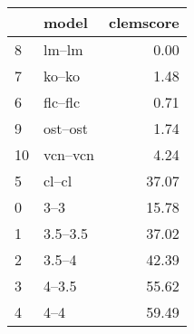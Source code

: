 \begin{tabular}{llr}
\toprule
 & model & clemscore \\
\midrule
8 & lm--lm & 0.00 \\
7 & ko--ko & 1.48 \\
6 & flc--flc & 0.71 \\
9 & ost--ost & 1.74 \\
10 & vcn--vcn & 4.24 \\
5 & cl--cl & 37.07 \\
0 & 3--3 & 15.78 \\
1 & 3.5--3.5 & 37.02 \\
2 & 3.5--4 & 42.39 \\
3 & 4--3.5 & 55.62 \\
4 & 4--4 & 59.49 \\
\bottomrule
\end{tabular}
